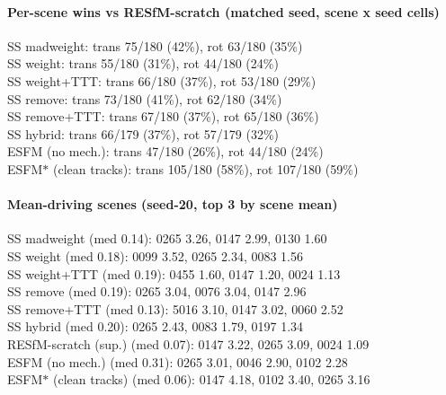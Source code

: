 \documentclass[10pt]{article}
\begin{document}
\paragraph{Per-scene wins vs RESfM-scratch (matched seed, scene x seed cells)}
\indent SS madweight: trans 75/180 (42\%), rot 63/180 (35\%)\\
\indent SS weight: trans 55/180 (31\%), rot 44/180 (24\%)\\
\indent SS weight+TTT: trans 66/180 (37\%), rot 53/180 (29\%)\\
\indent SS remove: trans 73/180 (41\%), rot 62/180 (34\%)\\
\indent SS remove+TTT: trans 67/180 (37\%), rot 65/180 (36\%)\\
\indent SS hybrid: trans 66/179 (37\%), rot 57/179 (32\%)\\
\indent ESFM (no mech.): trans 47/180 (26\%), rot 44/180 (24\%)\\
\indent ESFM$\ast$ (clean tracks): trans 105/180 (58\%), rot 107/180 (59\%)\\
\paragraph{Mean-driving scenes (seed-20, top 3 by scene mean)}
\indent SS madweight (med 0.14): 0265 3.26, 0147 2.99, 0130 1.60\\
\indent SS weight (med 0.18): 0099 3.52, 0265 2.34, 0083 1.56\\
\indent SS weight+TTT (med 0.19): 0455 1.60, 0147 1.20, 0024 1.13\\
\indent SS remove (med 0.19): 0265 3.04, 0076 3.04, 0147 2.96\\
\indent SS remove+TTT (med 0.13): 5016 3.10, 0147 3.02, 0060 2.52\\
\indent SS hybrid (med 0.20): 0265 2.43, 0083 1.79, 0197 1.34\\
\indent RESfM-scratch (sup.) (med 0.07): 0147 3.22, 0265 3.09, 0024 1.09\\
\indent ESFM (no mech.) (med 0.31): 0265 3.01, 0046 2.90, 0102 2.28\\
\indent ESFM$\ast$ (clean tracks) (med 0.06): 0147 4.18, 0102 3.40, 0265 3.16\\
\end{document}
